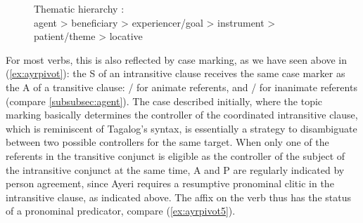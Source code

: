\begin{figure}[h]
\ex\label{ex:themhier}%
	Thematic hierarchy \citep[329]{bresnan2016}:\medskip \\
	agent > beneficiary > experiencer/goal > instrument > patient/theme >
	locative
\xe
\end{figure}

For most verbs, this is also reflected by case marking, as we have
seen above in (\ref{ex:ayrpivot}): the S of an intransitive clause receives the
same case marker as the A of a transitive clause:
/ for animate referents, and
/ for inanimate referents (compare
\autoref{subsubsec:agent}). The case described initially, where the topic
marking basically determines the controller of the coordinated intransitive
clause, which is reminiscent of Tagalog's syntax, is essentially a strategy to
disambiguate between two possible controllers for the same target. When only
one of the referents in the transitive conjunct is eligible as the controller
of the subject of the intransitive conjunct at the same time, A and P are
regularly indicated by person agreement, since Ayeri requires a resumptive
pronominal clitic in the intransitive clause, as indicated above. The affix on
the verb thus has the status of a pronominal predicator, compare
(\ref{ex:ayrpivot5}).


